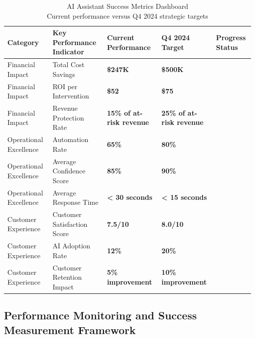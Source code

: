 \documentclass[
  letterpaper,
  DIV=11,
  numbers=noendperiod]{scrartcl}
\begin{document}
\begin{table}
\caption*{
{\large AI Assistant Success Metrics Dashboard} \\ 
{\small Current performance versus Q4 2024 strategic targets}
} 
\fontsize{9.0pt}{10.8pt}\selectfont
\begin{tabular*}{\linewidth}{@{\extracolsep{\fill}}lllll}
\toprule
Category & Key Performance Indicator & Current Performance & Q4 2024 Target & Progress Status \\ 
\midrule\addlinespace[2.5pt]
Financial Impact & Total Cost Savings & {\bfseries \$247K} & {\bfseries \$500K} & {\cellcolor[HTML]{7F7F7F}{\textcolor[HTML]{FFFFFF}{On Track}}} \\ 
Financial Impact & ROI per Intervention & {\bfseries \$52} & {\bfseries \$75} & {\cellcolor[HTML]{CCCCCC}{\textcolor[HTML]{000000}{Exceeding}}} \\ 
Financial Impact & Revenue Protection Rate & {\bfseries 15\% of at-risk revenue} & {\bfseries 25\% of at-risk revenue} & {\cellcolor[HTML]{7F7F7F}{\textcolor[HTML]{FFFFFF}{On Track}}} \\ 
Operational Excellence & Automation Rate & {\bfseries 65\%} & {\bfseries 80\%} & {\cellcolor[HTML]{7F7F7F}{\textcolor[HTML]{FFFFFF}{On Track}}} \\ 
Operational Excellence & Average Confidence Score & {\bfseries 85\%} & {\bfseries 90\%} & {\cellcolor[HTML]{CCCCCC}{\textcolor[HTML]{000000}{Exceeding}}} \\ 
Operational Excellence & Average Response Time & {\bfseries < 30 seconds} & {\bfseries < 15 seconds} & {\cellcolor[HTML]{7F7F7F}{\textcolor[HTML]{FFFFFF}{On Track}}} \\ 
Customer Experience & Customer Satisfaction Score & {\bfseries 7.5/10} & {\bfseries 8.0/10} & {\cellcolor[HTML]{7F7F7F}{\textcolor[HTML]{FFFFFF}{On Track}}} \\ 
Customer Experience & AI Adoption Rate & {\bfseries 12\%} & {\bfseries 20\%} & {\cellcolor[HTML]{4D4D4D}{\textcolor[HTML]{FFFFFF}{Behind}}} \\ 
Customer Experience & Customer Retention Impact & {\bfseries 5\% improvement} & {\bfseries 10\% improvement} & {\cellcolor[HTML]{7F7F7F}{\textcolor[HTML]{FFFFFF}{On Track}}} \\ 
\bottomrule
\end{tabular*}
\end{table}

\subsection{Performance Monitoring and Success Measurement
Framework}\label{performance-monitoring-and-success-measurement-framework}
\end{document}
